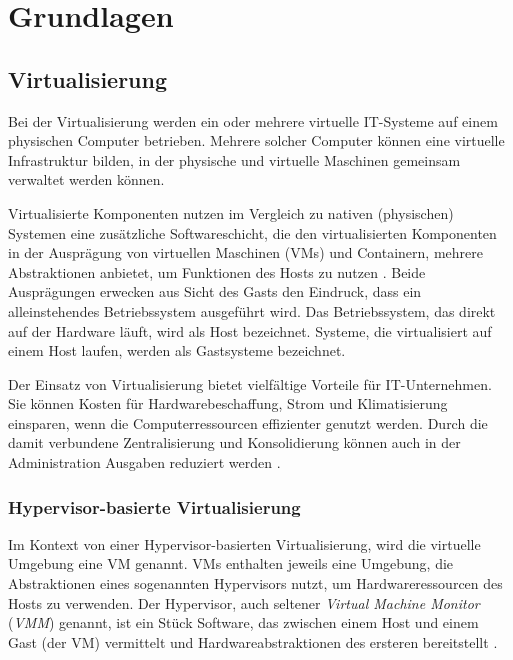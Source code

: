 \documentclass[../main.tex]{subfiles}
\begin{document}
\chapter{Grundlagen}
\label{basics}

	\section{Virtualisierung}
  \label{introVirt}
    Bei der Virtualisierung werden ein oder mehrere virtuelle \acrshort{IT}-Systeme auf einem physischen Computer betrieben. Mehrere solcher Computer können eine virtuelle Infrastruktur bilden, in der physische und virtuelle Maschinen gemeinsam verwaltet werden können.

		Virtualisierte Komponenten nutzen im Vergleich zu nativen (physischen) Systemen eine zusätzliche Softwareschicht, die den virtualisierten Komponenten in der Ausprägung von virtuellen Maschinen (\acrshort{VM}s) und Containern, mehrere Abstraktionen anbietet, um Funktionen des Hosts zu nutzen \cite[S.2]{containerVirtPerformance}. Beide Ausprägungen erwecken aus Sicht des Gasts den Eindruck, dass ein alleinstehendes Betriebssystem ausgeführt wird. Das Betriebssystem, das direkt auf der Hardware läuft, wird als Host bezeichnet. Systeme, die virtualisiert auf einem Host laufen, werden als Gastsysteme bezeichnet.

    Der Einsatz von Virtualisierung bietet vielfältige Vorteile für \acrshort{IT}-Unternehmen. Sie können Kosten für Hardwarebeschaffung, Strom und Klimatisierung einsparen, wenn die Computerressourcen effizienter genutzt werden. Durch die damit verbundene Zentralisierung und Konsolidierung können auch in der Administration Ausgaben reduziert werden  \cite[S.1]{bsiVirt}.



    \subsection{Hypervisor-basierte Virtualisierung}
    \label{introVirtHypervisor}
      Im Kontext von einer Hypervisor-basierten Virtualisierung, wird die virtuelle Umgebung eine \acrshort{VM} genannt. \acrshort{VM}s enthalten jeweils eine Umgebung, die Abstraktionen eines sogenannten Hypervisors nutzt, um Hardwareressourcen des Hosts zu verwenden. Der Hypervisor, auch seltener \emph{Virtual Machine Monitor} (\emph{VMM}) genannt, ist ein Stück Software, das zwischen einem Host und einem Gast (der \acrshort{VM}) vermittelt und Hardwareabstraktionen des ersteren bereitstellt \cite[S.6]{dockerBook}\cite[S.2]{containerVirtPerformance}\cite[S.2]{dockerSec1}.
\end{document}
